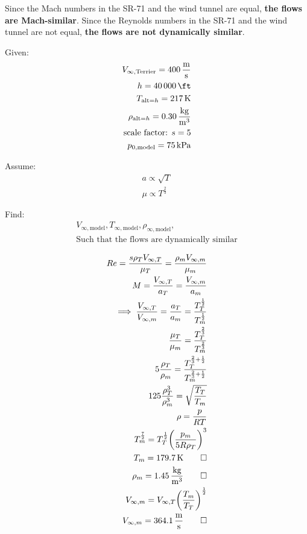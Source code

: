\begin{hwkProblem}{1}{}
	Since the Mach numbers in the SR-71 and the wind tunnel are equal, \textbf{the flows are Mach-similar}.
	Since the Reynolds numbers in the SR-71 and the wind tunnel are not equal, \textbf{the flows are not dynamically similar}.
\end{hwkProblem}

\begin{hwkProblem}{2}{}
	Given:
	\begin{align*}
		V_{\infty, \text{Terrier}} = \qty{400}{\m \per \s} \\
		h = \qty{40000}{\ft} \\ 
		T_{\text{alt} = h} = \qty{217}{\K} \\
		\rho_{\text{alt} = h} = \qty{0.30}{\kg \per \cubic \m} \\
		\text{scale factor: } s = 5 \\
		p_{0, \text{model}} = \qty{75}{\kilo \Pa} \\
	\end{align*}

	Assume:
	\begin{align*}
		a \propto \sqrt{T} \\
		\mu \propto T^{\frac{2}{3}}
	\end{align*}

	Find:
	\begin{align*}
		V_{\infty, \text{model}}, T_{\infty, \text{model}}, \rho_{\infty, \text{model}}, \\
		\text{Such that the flows are dynamically similar}
	\end{align*}
	
	\hwkSol

	\begin{align*}
		Re = \frac{s \rho_{T} V_{\infty, T}}{\mu_{T}} = \frac{\rho_{m} V_{\infty, m}}{\mu_{m}} \\
		M = \frac{V_{\infty, T}}{a_{T}} = \frac{V_{\infty, m}}{a_{m}} \\
		\implies \frac{V_{\infty, T}}{V_{\infty, m}} = \frac{a_{T}}{a_{m}} = \frac{T_{T}^{\frac{1}{2}}}{T_{m}^{\frac{1}{2}}} \\
		\frac{\mu_{T}}{\mu_{m}} = \frac{T_{T}^{\frac{2}{3}}}{T_{m}^{\frac{2}{3}}} \\
		5 \frac{\rho_{T}}{\rho_{m}} = \frac{T_{T}^{\frac{2}{3} + \frac{1}{2}}}{T_{m}^{\frac{2}{3} + \frac{1}{2}}} \\
		125 \frac{\rho_{T}^{3}}{\rho_{m}^{3}} = \sqrt{\frac{T_{T}}{T_{m}}} \\
		\rho = \frac{p}{RT} \\
		T_{m}^{\frac{7}{2}} = T_{T}^{\frac{1}{2}} {\left( \frac{p_{m}}{5 R \rho_{T}} \right)}^{3} \\
		T_{m} = \qty{179.7}{\K} \qed \\
		\rho_{m} = \qty{1.45}{\kg \per \cubic \m} \qed \\
		V_{\infty, m} = V_{\infty, T} {\left( \frac{T_{m}}{T_{T}} \right)}^{\frac{1}{2}} \\
		V_{\infty, m} = \qty{364.1}{\m \per \s} \qed
	\end{align*}
\end{hwkProblem}

